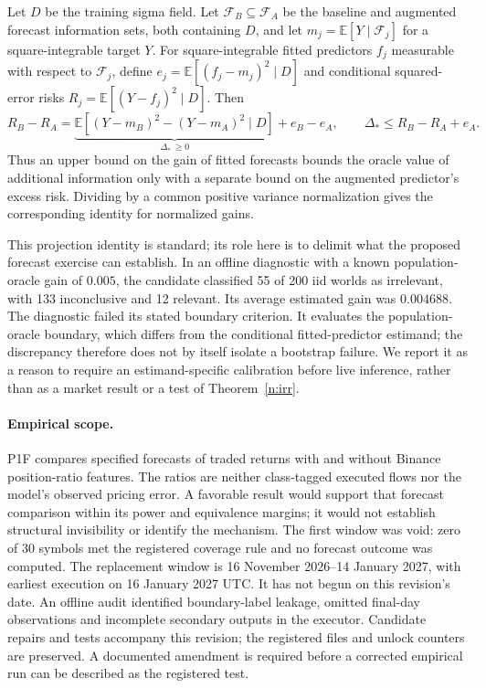 \begin{proposition}\label{n:learnergap}
Let $D$ be the training sigma field. Let $\mathcal F_B\subseteq\mathcal F_A$ be the baseline and augmented forecast information sets, both containing $D$, and let $m_j=\mathbb E[Y\mid\mathcal F_j]$ for a square-integrable target $Y$. For square-integrable fitted predictors $f_j$ measurable with respect to $\mathcal F_j$, define $e_j=\mathbb E[(f_j-m_j)^2\mid D]$ and conditional squared-error risks $R_j=\mathbb E[(Y-f_j)^2\mid D]$. Then
\[
R_B-R_A=\underbrace{\mathbb E[(Y-m_B)^2-(Y-m_A)^2\mid D]}_{\Delta_*\,\ge0}
+e_B-e_A,
\qquad \Delta_*\le R_B-R_A+e_A.
\]
Thus an upper bound on the gain of fitted forecasts bounds the oracle value of additional information only with a separate bound on the augmented predictor's excess risk. Dividing by a common positive variance normalization gives the corresponding identity for normalized gains.
\end{proposition}

This projection identity is standard; its role here is to delimit what the proposed forecast exercise can establish. In an offline diagnostic with a known population-oracle gain of $0.005$, the candidate classified 55 of 200 iid worlds as irrelevant, with 133 inconclusive and 12 relevant. Its average estimated gain was $0.004688$. The diagnostic failed its stated boundary criterion. It evaluates the population-oracle boundary, which differs from the conditional fitted-predictor estimand; the discrepancy therefore does not by itself isolate a bootstrap failure. We report it as a reason to require an estimand-specific calibration before live inference, rather than as a market result or a test of Theorem~\ref{n:irr}.

\paragraph{Empirical scope.} P1F compares specified forecasts of traded returns with and without Binance position-ratio features. The ratios are neither class-tagged executed flows nor the model's observed pricing error. A favorable result would support that forecast comparison within its power and equivalence margins; it would not establish structural invisibility or identify the mechanism. The first window was void: zero of 30 symbols met the registered coverage rule and no forecast outcome was computed. The replacement window is 16 November 2026--14 January 2027, with earliest execution on 16 January 2027 UTC. It has not begun on this revision's date. An offline audit identified boundary-label leakage, omitted final-day observations and incomplete secondary outputs in the executor. Candidate repairs and tests accompany this revision; the registered files and unlock counters are preserved. A documented amendment is required before a corrected empirical run can be described as the registered test.

